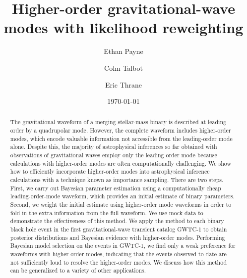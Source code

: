 \documentclass[prd,superscriptaddress,twocolumn,nopreprintnumbers,floatfix,longbibliography]{revtex4}
\begin{document}
\title{Higher-order gravitational-wave modes with likelihood reweighting}

\author{Ethan Payne}

\author{Colm Talbot}

\author{Eric Thrane}

\date{\today}

\begin{abstract}
The gravitational waveform of a merging stellar-mass binary is described at leading order by a quadrupolar mode.
However, the complete waveform includes higher-order modes, which encode valuable information not accessible from the leading-order mode alone.
Despite this, the majority of astrophysical inferences so far obtained with observations of gravitational waves employ only the leading order mode because calculations with higher-order modes are often computationally challenging.
We show how to efficiently incorporate higher-order modes into astrophysical inference calculations with a technique known as importance sampling.
There are two steps.
First, we carry out Bayesian parameter estimation using a computationally cheap leading-order-mode waveform, which provides an initial estimate of binary parameters.
Second, we weight the initial estimate using higher-order mode waveforms in order to fold in the extra information from the full waveform.
We use mock data to demonstrate the effectiveness of this method.
We apply the method to each binary black hole event in the first gravitational-wave transient catalog GWTC-1 to obtain posterior distributions and Bayesian evidence with higher-order modes.
Performing Bayesian model selection on the events in GWTC-1, we find only a weak preference for waveforms with higher-order modes, indicating that the events observed to date are not sufficiently loud to resolve the higher-order modes.
We discuss how this method can be generalized to a variety of other applications.
\end{abstract}
\end{document}
